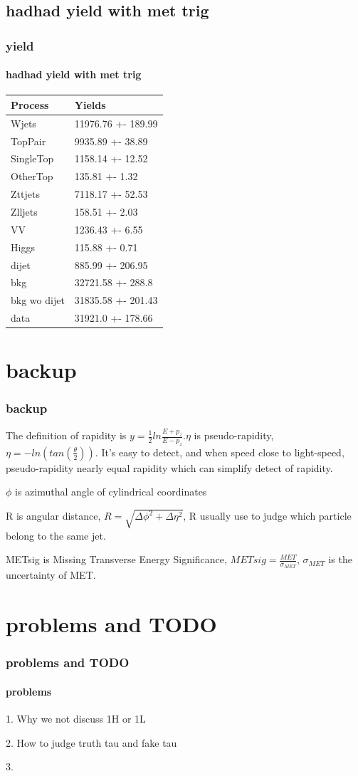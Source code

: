 \documentclass[usenames,dvipsnames]{beamer}
\begin{document}
\subsection{hadhad yield with met trig}
\begin{frame}
	\frametitle{yield}
	\framesubtitle{hadhad yield with met trig}
	\begin{table}[!ht]
    \centering
    \begin{tabular}{|l|l|}
    \hline
        Process & Yields \\ \hline
        Wjets & 11976.76 +- 189.99 \\ \hline
        TopPair & 9935.89 +- 38.89 \\ \hline
        SingleTop & 1158.14 +- 12.52 \\ \hline
        OtherTop & 135.81 +- 1.32 \\ \hline
        Zttjets & 7118.17 +- 52.53 \\ \hline
        Zlljets & 158.51 +- 2.03 \\ \hline
        VV & 1236.43 +- 6.55 \\ \hline
        Higgs & 115.88 +- 0.71 \\ \hline
        dijet & 885.99 +- 206.95 \\ \hline
        bkg & 32721.58 +- 288.8 \\ \hline
        bkg wo dijet & 31835.58 +- 201.43 \\ \hline
        data & 31921.0 +- 178.66 \\ \hline
    \end{tabular}
\end{table}
\end{frame}
\section{backup}
\begin{frame}
	\frametitle{backup}
	The definition of rapidity is $y = \frac{1}{2}ln\frac{E+p_z}{E-p_z}$.$\eta$ is pseudo-rapidity, $\eta = -ln(tan(\frac{\theta}{2})).$ It's easy to detect, and when speed close to light-speed, pseudo-rapidity nearly equal rapidity which can simplify detect of rapidity.
	
	$\phi$ is azimuthal angle of cylindrical coordinates
	
	R is angular distance, $R = \sqrt{\Delta\phi^2+\Delta\eta^2}$, R usually use to judge which particle belong to the same jet.
	
	METsig is Missing Transverse Energy Significance, $METsig = \frac{MET}{\sigma_{MET}}$, $\sigma_{MET}$ is the uncertainty of MET.
	
\end{frame}
\section{problems and TODO}
\begin{frame}
	\frametitle{problems and TODO}
	\framesubtitle{problems}
	1. Why we not discuss 1H or 1L 
	
	2. How to judge truth tau and fake tau
	
	3. 
	
\end{frame}
\end{document}
